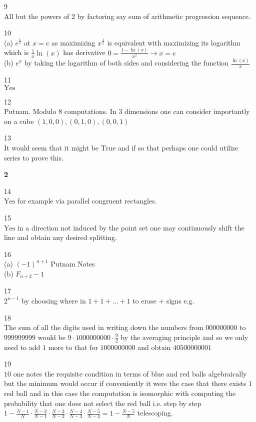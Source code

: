 9 \\
All but the powers of $2$ by factoring say sum of arithmetic progression sequence.

10 \\
(a) $\boxed{e^{\frac{1}{e}}}$ at $x=e$ as maximizing $x^{\frac{1}{x}}$ is equivalent with maximizing its logarithm which is $\frac{1}{x}\ln(x)$ has derivative $0=\frac{1-\ln(x)}{x^2} \to x=e$ \\
(b) $\boxed{e^{\pi}}$ by taking the logarithm of both sides and considering the function $\frac{\ln(x)}{x}$

11 \\
$\boxed{\text{Yes}}$

12 \\
Putnam. Modulo $8$ computations. In $3$ dimensions one can consider importantly on a cube $(1,0,0),(0,1,0),(0,0,1)$

13 \\
It would seem that it might be $\boxed{\text{True}}$ and if so that perhaps one could utilize series to prove this.

\newpage

\textbf{2}

14 \\
$\boxed{\text{Yes}}$ for example via parallel congruent rectangles.

15 \\
$\boxed{\text{Yes}}$ in a direction not induced by the point set one may continuously shift the line and obtain any desired splitting.

16 \\
(a) $\boxed{(-1)^{n+1}}$ Putnam Notes \\
(b) $\boxed{F_{n+2}-1}$

17 \\
$\boxed{2^{n-1}}$ by choosing where in $1+1+\dots+1$ to erase $+$ signs e.g.

18 \\
The sum of all the digits used in writing down the numbers from $000000000$ to $999999999$ would be $9 \cdot 1000000000 \cdot \frac{9}{2}$ by the averaging principle and so we only need to add $1$ more to that for $1000000000$ and obtain $\boxed{40500000001}$

19 \\
$\boxed{10}$ one notes the requisite condition in terms of blue and red balls algebraically but the minimum would occur if conveniently it were the case that there exists $1$ red ball and in this case the computation is isomorphic with computing the probability that one does not select the red ball i.e. step by step $1 - \frac{N-1}{N} \cdot \frac{N-2}{N-1} \cdot \frac{N-3}{N-2} \cdot \frac{N-4}{N-3} \cdot \frac{N-5}{N-4} = 1 - \frac{N-5}{N}$ telescoping.

